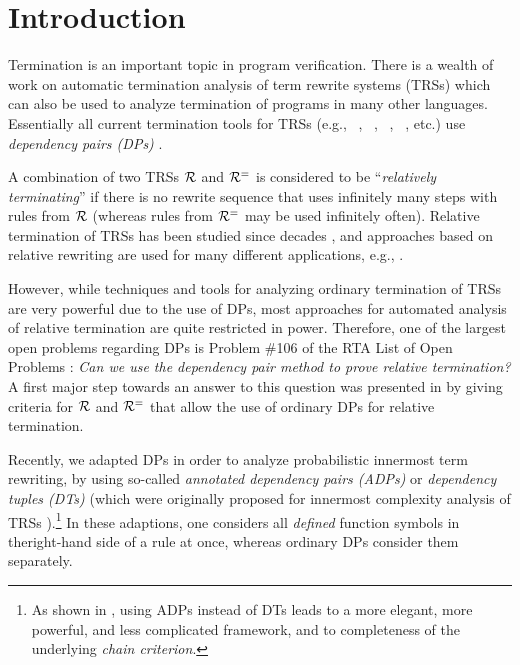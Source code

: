\section{Introduction}\label{Introduction}

Termination is an important topic in program verification.
There is a wealth of work on
automatic termination analysis of term rewrite systems (TRSs) which can also be used to
analyze termination of programs in many other languages.
Essentially all current termination tools for TRSs (e.g., \aprove~\cite{JAR-AProVE2017}, \natt~\cite{natt_sys_2014}, \muterm~\cite{gutierrez_mu-term_2020}, \ttttwo~\cite{ttt2_sys}, etc.)
use \emph{dependency pairs (DPs)}
\cite{arts2000termination,gieslLPAR04dpframework,giesl2006mechanizing,hirokawa2005automating,DBLP:journals/iandc/HirokawaM07}.


A combination of two TRSs $\mathcal{R}$ and $\mathcal{R}^{=}$
is considered to be ``\emph{relatively terminating}'' if there is no 
rewrite sequence that uses infinitely many steps
with rules from $\mathcal{R}$ (whereas rules from $\mathcal{R}^{=}$ may be used infinitely often).
Relative termination of TRSs has been
studied since decades \cite{DBLP:phd/dnb/Geser90}, and approaches based on
relative rewriting are used for many different applications, e.g.,
\cite{koprowskiZantema2005LivenessRelRew,fuhs2019DerivToRuntime,DBLP:journals/lmcs/NageleFZ17,DBLP:journals/corr/ZanklK14,DBLP:journals/jar/HirokawaM11,DBLP:conf/lpar/KleinH12,DBLP:conf/lopstr/IborraNV09,DBLP:journals/aaecc/NishidaV10,DBLP:conf/flops/Vidal08}.

However, while techniques and tools for analyzing ordinary termination of  TRSs
are very powerful due to the use of DPs, 
most approaches for automated analysis of relative termination are quite restricted in
power. Therefore, 
one of the largest open problems regarding DPs is Problem \#106 of the RTA List of Open Problems \cite{RTALoop}: 
\emph{Can we use the dependency pair method to prove relative termination?}
A first major step towards an answer to this question was presented in
\cite{iborra2017relative} by giving  criteria for $\mathcal{R}$ and $\mathcal{R}^{=}$ that allow the use of
ordinary DPs for relative termination. 

Recently, we adapted DPs  in order to analyze probabilistic innermost term rewriting, by using so-called
\emph{annotated dependency pairs (ADPs)} \cite{FLOPS2024}
or \emph{dependency tuples (DTs)} \cite{kassinggiesl2023iAST} (which were originally proposed
for innermost complexity analysis of  TRSs \cite{noschinski2013analyzing}).\footnote{As shown in
\cite{FLOPS2024}, using ADPs instead of DTs leads to a more elegant,
more powerful, and less complicated framework, and to completeness of
the underlying \emph{chain criterion}.}
In these adaptions, one \pagebreak[2] considers all \emph{defined} function symbols in the\linebreak[2]
right-hand side
of a rule at once, whereas ordinary DPs 
consider them separately.

